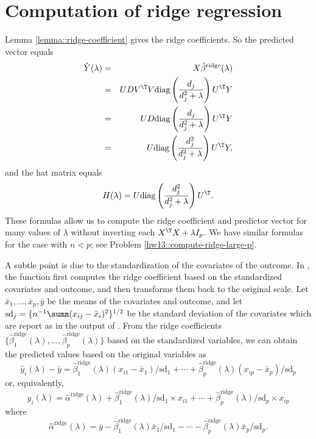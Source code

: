 \section{Computation of ridge regression}\label{sec::computation-ridge}
 
 
Lemma \ref{lemma::ridge-coefficient} gives the ridge coefficients. So
 the predicted vector equals
\begin{eqnarray*}
 \hat{Y}(\lambda) &=& X  \hat{\beta}^{\text{ridge}}(\lambda) \\
&=& UDV^{\T} V\text{diag}\left(  \frac{d_j}{d_j^2 + \lambda }  \right)  U^{\T} Y \\
&=& UD \text{diag}\left(  \frac{d_j}{d_j^2 + \lambda }  \right)  U^{\T} Y \\
&=& U \text{diag}\left(  \frac{d_j^2}{d_j^2 + \lambda }  \right)  U^{\T} Y,
\end{eqnarray*}
and the hat matrix equals
\begin{eqnarray*}
H  (\lambda)  = U \text{diag}\left(  \frac{d_j^2}{d_j^2 + \lambda }  \right)   U^{\T}.
\end{eqnarray*}
These formulas allow us to compute the ridge coefficient and predictor vector for many values of $\lambda$ without inverting each $X^{\T} X + \lambda I_p$. 
We have similar formulas for the case with $n<p$; see Problem \ref{hw13::compute-ridge-large-p}.  


A subtle point is due to the standardization of the covariates of the outcome. In , the  function first computes the ridge coefficient based on the standardized covariates and outcome, and then transforms them back to the original scale. Let $\bar{x}_1,\ldots, \bar{x}_p, \bar{y}$ be the means of the covariates and outcome, and let $\text{sd}_j = \{ n^{-1} \sumn (x_{ij} - \bar{x}_i) ^2 \}^{1/2}$ be the standard deviation of the covariates which are report as  in the output of . From the ridge coefficients $\{ \hat{\beta}_1^\text{ridge}(\lambda) ,\ldots,  \hat{\beta}_p^\text{ridge}(\lambda) \}$ based on the standardized variables, we can obtain the predicted values based on the original variables as
$$
\hat{y}_i(\lambda ) - \bar{y} =  \hat{\beta}_1^\text{ridge}(\lambda)  (x_{i1} - \bar{x}_1)/\text{sd}_1 + \cdots +  \hat{\beta}_p^\text{ridge}(\lambda)  (x_{ip} - \bar{x}_p)/\text{sd}_p
$$
or, equivalently,
$$
\hat{y}_i(\lambda )  = \hat\alpha^\text{ridge}(\lambda) 
+  \hat{\beta}_1^\text{ridge}(\lambda) /  \text{sd}_1 \times  x_{i1} + \cdots +  \hat{\beta}_p^\text{ridge}(\lambda)  / \text{sd}_p \times x_{ip}   
$$
where 
$$
\hat\alpha^\text{ridge}(\lambda)  = 
\bar{y} - \hat{\beta}_1^\text{ridge}(\lambda) \bar{x}_1/ \text{sd}_1 -  \cdots - \hat{\beta}_p^\text{ridge}(\lambda) \bar{x}_p/ \text{sd}_p . 
$$



